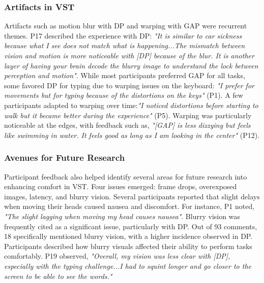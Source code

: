 \subsubsection{\textbf{Artifacts in VST}}
Artifacts such as motion blur with DP and warping with GAP were recurrent themes. P17 described the experience with DP: 
\textit{"It is similar to car sickness because what I see does not match what is happening...The mismatch between vision and motion is more noticeable with [DP] because of the blur. It is another layer of having your brain decode the blurry image to understand the lock between perception and motion"}. While most participants preferred GAP for all tasks, some favored DP for typing due to warping issues on the keyboard: \textit{"I prefer \GAP for movements but \DP for typing because of the distortions on the keys"} (P1). A few participants adapted to warping over time:\textit{"I noticed distortions before starting to walk but it became better during the experience"} (P5). Warping was particularly noticeable at the edges, with feedback such as,
\textit{"[GAP] is less dizzying but feels like swimming in water. It feels good as long as I am looking in the center"} (P12).  


\subsubsection{\textbf{Avenues for Future Research}}
Participant feedback also helped identify several areas for future research into enhancing comfort in VST. Four issues emerged: frame drops, overexposed images, latency, and blurry vision.  Several participants reported that slight delays when moving their heads caused nausea and discomfort. For instance, P1 noted, \textit{"The slight lagging when moving my head causes nausea"}. Blurry vision was frequently cited as a significant issue, particularly with DP. Out of 93 comments, 18 specifically mentioned blurry vision, with a higher incidence observed in DP. Participants described how blurry visuals affected their ability to perform tasks comfortably. P19 observed, 
\textit{"Overall, my vision was less clear with [DP], especially with the typing challenge...I had to squint longer and go closer to the screen to be able to see the words."} 

